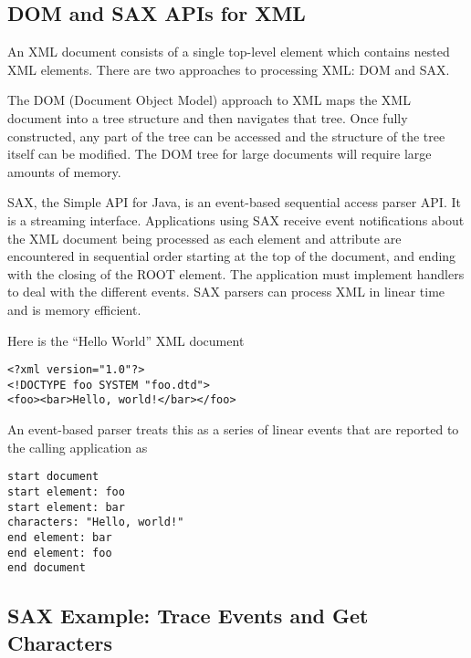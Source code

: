 \subsection{DOM and SAX APIs for XML}\label{xml-dom-sax}

An XML document consists of a single top-level element which contains
nested XML elements.   There are two approaches to processing XML:
DOM and SAX.

The DOM (Document Object Model) approach to XML maps the XML document into a tree structure
and then navigates that tree.  
Once fully constructed, any part of the tree can be accessed and the structure of 
the tree itself can be modified.
The DOM tree for large documents will require large amounts of memory.

SAX, the Simple API for Java, is an event-based sequential access
parser API.  It is a streaming interface.  Applications using SAX
receive event notifications about the XML document being processed as each
element and attribute are encountered in sequential order starting at the
top of the document, and ending with the closing of the ROOT
element. The application must implement handlers to deal with the different events.
SAX parsers can process XML in
linear time and is memory efficient.

Here is the ``Hello World'' XML document
\begin{verbatim}
<?xml version="1.0"?>
<!DOCTYPE foo SYSTEM "foo.dtd">
<foo><bar>Hello, world!</bar></foo>
\end{verbatim}

An event-based parser treats this as a series of linear events
that are reported to the calling application as
\begin{verbatim}
start document
start element: foo
start element: bar
characters: "Hello, world!"
end element: bar
end element: foo
end document
\end{verbatim}

\subsection{SAX Example: Trace Events and Get Characters}

